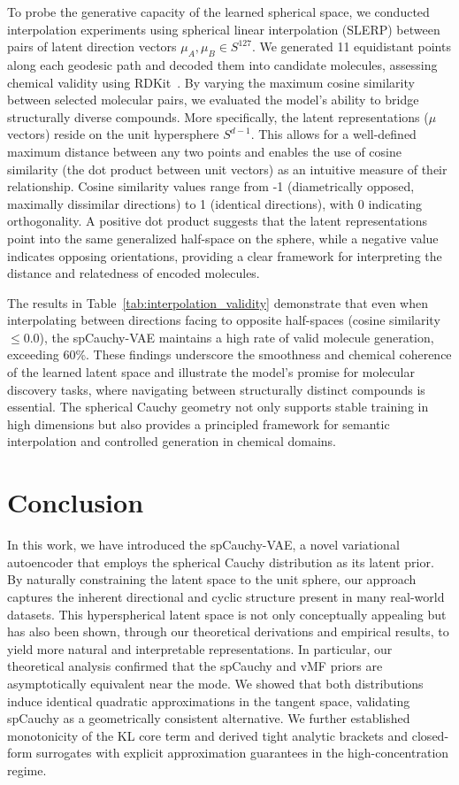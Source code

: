 \documentclass{article}
\begin{document}
To probe the generative capacity of the learned spherical space, we conducted interpolation experiments using spherical linear interpolation (SLERP) between pairs of latent direction vectors \(\mu_A, \mu_B \in S^{127}\). We generated 11 equidistant points along each geodesic path and decoded them into candidate molecules, assessing chemical validity using RDKit~\citep{RDKit}. By varying the maximum cosine similarity between selected molecular pairs, we evaluated the model’s ability to bridge structurally diverse compounds. More specifically, the latent representations (\(\mu\) vectors) reside on the unit hypersphere \(S^{d-1}\). This allows for a well-defined maximum distance between any two points and enables the use of cosine similarity (the dot product between unit vectors) as an intuitive measure of their relationship. Cosine similarity values range from -1 (diametrically opposed, maximally dissimilar directions) to 1 (identical directions), with 0 indicating orthogonality. A positive dot product suggests that the latent representations point into the same generalized half-space on the sphere, while a negative value indicates opposing orientations, providing a clear framework for interpreting the distance and relatedness of encoded molecules.

The results in Table~\ref{tab:interpolation_validity} demonstrate that even when interpolating between directions facing to opposite half-spaces (cosine similarity \(\leq 0.0\)), the spCauchy-VAE maintains a high rate of valid molecule generation, exceeding 60\%. These findings underscore the smoothness and chemical coherence of the learned latent space and illustrate the model's promise for molecular discovery tasks, where navigating between structurally distinct compounds is essential. The spherical Cauchy geometry not only supports stable training in high dimensions but also provides a principled framework for semantic interpolation and controlled generation in chemical domains.



\section{Conclusion}

In this work, we have introduced the spCauchy-VAE, a novel variational autoencoder that employs the spherical Cauchy distribution as its latent prior. By naturally constraining the latent space to the unit sphere, our approach captures the inherent directional and cyclic structure present in many real-world datasets. This hyperspherical latent space is not only conceptually appealing but has also been shown, through our theoretical derivations and empirical results, to yield more natural and interpretable representations. In particular, our theoretical analysis confirmed that the spCauchy and vMF priors are asymptotically equivalent near the mode. We showed that both distributions induce identical quadratic approximations in the tangent space, validating spCauchy as a geometrically consistent alternative. We further established monotonicity of the KL core term and derived tight analytic brackets and closed-form surrogates with explicit approximation guarantees in the high-concentration regime.
\end{document}
